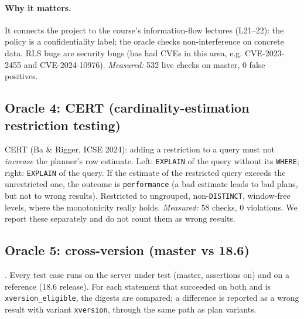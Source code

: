 \paragraph{Why it matters.} It connects the project to the course's
information-flow lectures (L21--22): the policy is a confidentiality label; the
oracle checks non-interference on concrete data. RLS bugs are security bugs
(\pg has had CVEs in this area, e.g. CVE-2023-2455 and CVE-2024-10976).
\emph{Measured:} 532 live checks on master, 0 false positives.

\subsection{Oracle 4: CERT (cardinality-estimation restriction testing)}
\label{sec:cert}

CERT (Ba \& Rigger, ICSE 2024): adding a restriction to a query must not
\emph{increase} the planner's row estimate. Left: \texttt{EXPLAIN} of the query
without its \texttt{WHERE}; right: \texttt{EXPLAIN} of the query. If the
estimate of the restricted query exceeds the unrestricted one, the outcome is
\texttt{performance} (a bad estimate leads to bad plans, but not to wrong
results). Restricted to ungrouped, non-\texttt{DISTINCT}, window-free levels,
where the monotonicity really holds. \emph{Measured:} 58 checks, 0 violations.
We report these separately and do not count them as wrong results.

\subsection{Oracle 5: cross-version (master vs 18.6)}
\label{sec:xversion}

. Every test case runs on the
server under test (master, assertions on) and on a reference (18.6 release).
For each statement that succeeded on both and is \texttt{xversion\_eligible},
the digests are compared; a difference is reported as a wrong result with
variant \texttt{xversion}, through the same path as plan variants.

